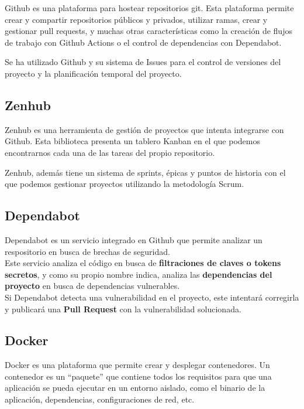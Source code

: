 Github es una plataforma para hostear repositorios git. Esta plataforma
permite crear y compartir repositorios públicos y privados, utilizar
ramas, crear y gestionar pull requests, y muchas otras características
como la creación de flujos de trabajo con Github Actions o el control de
dependencias con Dependabot.

Se ha utilizado Github y su sistema de Issues para el control de
versiones del proyecto y la planificación temporal del proyecto.

\hypertarget{zenhub}{%
\subsection{Zenhub}\label{zenhub}}

Zenhub es una herramienta de gestión de proyectos que intenta integrarse
con Github. Esta biblioteca presenta un tablero Kanban en el que podemos
encontrarnos cada una de las tareas del propio repositorio.

Zenhub, además tiene un sistema de sprints, épicas y puntos de historia
con el que podemos gestionar proyectos utilizando la metodología Scrum.

\hypertarget{dependabot}{%
\subsection{\texorpdfstring{Dependabot
}{Dependabot }}\label{dependabot}}

Dependabot es un servicio integrado en Github que permite analizar un
respositorio en busca de brechas de seguridad.\\
Este servicio analiza el código en busca de \textbf{filtraciones de
claves o tokens secretos}, y como su propio nombre indica, analiza las
\textbf{dependencias del proyecto} en busca de dependencias vulnerables.\\
Si Dependabot detecta una vulnerabilidad en el proyecto, este intentará
corregirla y publicará una \textbf{Pull Request} con la vulnerabilidad
solucionada.

\hypertarget{docker}{%
\subsection{Docker}\label{docker}}

Docker es una plataforma que permite crear y desplegar contenedores. Un
contenedor es un ``paquete'' que contiene todos los requisitos para que
una aplicación se pueda ejecutar en un entorno aislado, como el binario
de la aplicación, dependencias, configuraciones de red, etc.


